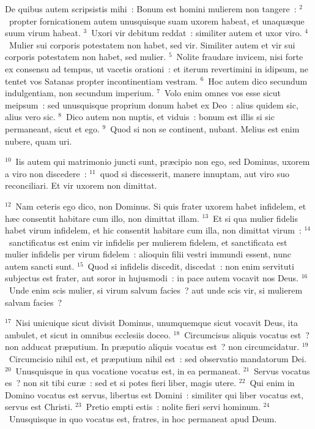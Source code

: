 \lettrine[lines=10,image=true,loversize=0.05,lraise=-0.03]{D}{}e quibus autem scripsistis mihi~: Bonum est homini mulierem non tangere~:
${}^{2}$~propter fornicationem autem unusquisque suam uxorem habeat, et unaqu\ae que suum virum habeat.
${}^{3}$~Uxori vir debitum reddat~: similiter autem et uxor viro.
${}^{4}$~Mulier sui corporis potestatem non habet, sed vir. Similiter autem et vir sui corporis potestatem non habet, sed mulier.
${}^{5}$~Nolite fraudare invicem, nisi forte ex consensu ad tempus, ut vacetis orationi~: et iterum revertimini in idipsum, ne tentet vos Satanas propter incontinentiam vestram.
${}^{6}$~Hoc autem dico secundum indulgentiam, non secundum imperium.
${}^{7}$~Volo enim omnes vos esse sicut meipsum~: sed unusquisque proprium donum habet ex Deo~: alius quidem sic, alius vero sic.
${}^{8}$~Dico autem non nuptis, et viduis~: bonum est illis si sic permaneant, sicut et ego.
${}^{9}$~Quod si non se continent, nubant. Melius est enim nubere, quam uri.


${}^{10}$~Iis autem qui matrimonio juncti sunt, pr\ae cipio non ego, sed Dominus, uxorem a viro non discedere~:
${}^{11}$~quod si discesserit, manere innuptam, aut viro suo reconciliari. Et vir uxorem non dimittat.


${}^{12}$~Nam ceteris ego dico, non Dominus. Si quis frater uxorem habet infidelem, et h\ae c consentit habitare cum illo, non dimittat illam.
${}^{13}$~Et si qua mulier fidelis habet virum infidelem, et hic consentit habitare cum illa, non dimittat virum~:
${}^{14}$~sanctificatus est enim vir infidelis per mulierem fidelem, et sanctificata est mulier infidelis per virum fidelem~: alioquin filii vestri immundi essent, nunc autem sancti sunt.
${}^{15}$~Quod si infidelis discedit, discedat~: non enim servituti subjectus est frater, aut soror in hujusmodi~: in pace autem vocavit nos Deus.
${}^{16}$~Unde enim scis mulier, si virum salvum facies~? aut unde scis vir, si mulierem salvam facies~?


${}^{17}$~Nisi unicuique sicut divisit Dominus, unumquemque sicut vocavit Deus, ita ambulet, et sicut in omnibus ecclesiis doceo.
${}^{18}$~Circumcisus aliquis vocatus est~? non adducat pr\ae putium. In pr\ae putio aliquis vocatus est~? non circumcidatur.
${}^{19}$~Circumcisio nihil est, et pr\ae putium nihil est~: sed observatio mandatorum Dei.
${}^{20}$~Unusquisque in qua vocatione vocatus est, in ea permaneat.
${}^{21}$~Servus vocatus es~? non sit tibi cur\ae~: sed et si potes fieri liber, magis utere.
${}^{22}$~Qui enim in Domino vocatus est servus, libertus est Domini~: similiter qui liber vocatus est, servus est Christi.
${}^{23}$~Pretio empti estis~: nolite fieri servi hominum.
${}^{24}$~Unusquisque in quo vocatus est, fratres, in hoc permaneat apud Deum.


